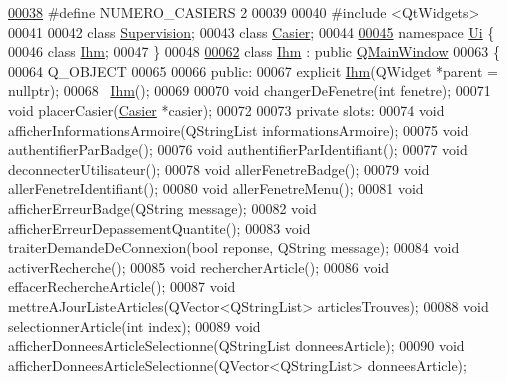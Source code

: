 \begin{DoxyCode}
\hyperlink{_ihm_8h_a7935787ef2fa7206f347feff73167ce6}{00038} \textcolor{preprocessor}{#define NUMERO\_CASIERS 2}
00039 
00040 \textcolor{preprocessor}{#include <QtWidgets>}
00041 
00042 \textcolor{keyword}{class }\hyperlink{class_supervision}{Supervision};
00043 \textcolor{keyword}{class }\hyperlink{class_casier}{Casier};
00044 
\hyperlink{namespace_ui}{00045} \textcolor{keyword}{namespace }\hyperlink{namespace_ui}{Ui} \{
00046 \textcolor{keyword}{class }\hyperlink{class_ihm}{Ihm};
00047 \}
00048 
\hyperlink{class_ihm}{00062} \textcolor{keyword}{class }\hyperlink{class_ihm}{Ihm} : \textcolor{keyword}{public} \hyperlink{class_q_main_window}{QMainWindow}
00063 \{
00064     Q\_OBJECT
00065 
00066 \textcolor{keyword}{public}:
00067     \textcolor{keyword}{explicit} \hyperlink{class_ihm}{Ihm}(QWidget *parent = \textcolor{keyword}{nullptr});
00068     ~\hyperlink{class_ihm}{Ihm}();
00069 
00070     \textcolor{keywordtype}{void} changerDeFenetre(\textcolor{keywordtype}{int} fenetre);
00071     \textcolor{keywordtype}{void} placerCasier(\hyperlink{class_casier}{Casier} *casier);
00072 
00073 \textcolor{keyword}{private} slots:
00074     \textcolor{keywordtype}{void} afficherInformationsArmoire(QStringList informationsArmoire);
00075     \textcolor{keywordtype}{void} authentifierParBadge();
00076     \textcolor{keywordtype}{void} authentifierParIdentifiant();
00077     \textcolor{keywordtype}{void} deconnecterUtilisateur();
00078     \textcolor{keywordtype}{void} allerFenetreBadge();
00079     \textcolor{keywordtype}{void} allerFenetreIdentifiant();    
00080     \textcolor{keywordtype}{void} allerFenetreMenu();
00081     \textcolor{keywordtype}{void} afficherErreurBadge(QString message);
00082     \textcolor{keywordtype}{void} afficherErreurDepassementQuantite();
00083     \textcolor{keywordtype}{void} traiterDemandeDeConnexion(\textcolor{keywordtype}{bool} reponse, QString message);
00084     \textcolor{keywordtype}{void} activerRecherche();
00085     \textcolor{keywordtype}{void} rechercherArticle();
00086     \textcolor{keywordtype}{void} effacerRechercheArticle();
00087     \textcolor{keywordtype}{void} mettreAJourListeArticles(QVector<QStringList> articlesTrouves);
00088     \textcolor{keywordtype}{void} selectionnerArticle(\textcolor{keywordtype}{int} index);
00089     \textcolor{keywordtype}{void} afficherDonneesArticleSelectionne(QStringList donneesArticle);
00090     \textcolor{keywordtype}{void} afficherDonneesArticleSelectionne(QVector<QStringList> donneesArticle);

\end{DoxyCode}
